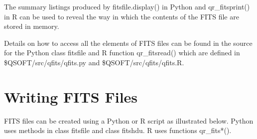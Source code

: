 \documentclass[letterpaper,10pt,english]{sphinxmanual}
\begin{document}
The summary listings produced by fitsfile.display() in Python and
qr\_fitsprint() in R can be used to reveal the way in which the contents of
the FITS file are stored in memory.

Details on how to access all the elements of FITS files can be found in the
source for the Python class fitsfile and R function qr\_fitsread() which are
defined in \$QSOFT/src/qfits/qfits.py and \$QSOFT/src/qfits/qfits.R.


\section{Writing FITS Files}
\label{\detokenize{qfits_write:writing-fits-files}}\label{\detokenize{qfits_write::doc}}
FITS files can be created using a Python or R script as
illustrated below. Python uses methods in class fitsfile and
class fitshdu. R uses functions qr\_fits*().
\end{document}
